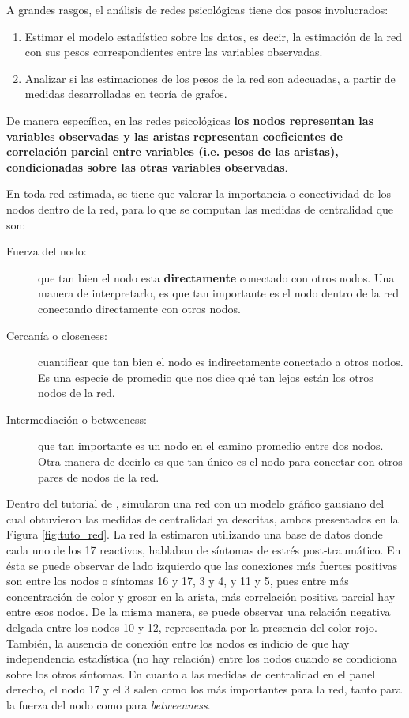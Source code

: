 \documentclass[11pt,spanish]{article}\usepackage[]{graphicx}\usepackage[]{color}
\begin{document}
A grandes rasgos, el análisis de redes psicológicas tiene dos pasos involucrados:

\begin{enumerate}
  \item Estimar el modelo estadístico sobre los datos, es decir, la estimación de la red con sus pesos correspondientes entre las variables observadas. 
  \item Analizar si las estimaciones de los pesos de la red son adecuadas, a partir de medidas desarrolladas en teoría de grafos. 
\end{enumerate}

De manera específica, en las redes psicológicas {\bf los nodos representan las variables observadas y las aristas representan coeficientes de correlación parcial entre variables (i.e. pesos de las aristas), condicionadas sobre las otras variables observadas}. 

En toda red estimada, se tiene que valorar la importancia o conectividad de los nodos dentro de la red, para lo que se computan las medidas de centralidad \citep{felipe} que son: 

\begin{description}
  \item[Fuerza del nodo:] que tan bien el nodo esta {\bf directamente} conectado con otros nodos. Una manera de interpretarlo, es que tan importante es el nodo dentro de la red conectando directamente con otros nodos. 
  \item[Cercanía o closeness:] cuantificar que tan bien el nodo es indirectamente conectado a otros nodos. Es una especie de promedio que nos dice qué tan lejos están los otros nodos de la red. 
  \item[Intermediación o betweeness:] que tan importante es un nodo en el camino promedio entre dos nodos. Otra manera de decirlo es que tan único es el nodo para conectar con otros pares de nodos de la red. 
\end{description}

Dentro del tutorial de \cite{main_tutorial}, simularon una red con un modelo gráfico gausiano del cual obtuvieron las medidas de centralidad ya descritas, ambos presentados en la Figura \ref{fig:tuto_red}. La red la estimaron utilizando una base de datos donde cada uno de los 17 reactivos, hablaban de síntomas de estrés post-traumático. En ésta se puede observar de lado izquierdo que las conexiones más fuertes positivas son entre los nodos o síntomas 16 y 17, 3 y 4, y 11 y 5, pues entre más concentración de color y grosor en la arista, más correlación positiva parcial hay entre esos nodos. De la misma manera, se puede observar una relación negativa delgada entre los nodos 10 y 12, representada por la presencia del color rojo. También, la ausencia de conexión entre los nodos es indicio de que hay independencia estadística (no hay relación) entre los nodos cuando se condiciona sobre los otros síntomas. En cuanto a las medidas de centralidad en el panel derecho, el nodo 17 y el 3 salen como los más importantes para la red, tanto para la fuerza del nodo como para \emph{betweenness}. 
\end{document}
